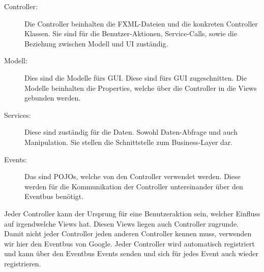 \begin{description}
	\item[Controller:] Die Controller beinhalten die FXML-Dateien und die konkreten Controller Klassen. Sie sind für die Benutzer-Aktionen, Service-Calls, sowie die Beziehung zwischen Modell und UI zuständig.
	\item[Modell:] Dies sind die Modelle fürs GUI. Diese sind fürs GUI zugeschnitten. Die Modelle beinhalten die Properties, welche über die Controller in die Views gebunden werden.
	\item[Services:] Diese sind zuständig für die Daten. Sowohl Daten-Abfrage und auch Manipulation. Sie stellen die Schnittstelle zum Business-Layer dar.
	\item[Events:] Das sind POJOs, welche von den Controller verwendet werden. Diese werden für die Kommunikation der Controller untereinander über den Eventbus benötigt.
\end{description}
Jeder Controller kann der Ursprung für eine Benutzeraktion sein, welcher Einfluss auf irgendwelche Views hat. Diesen Views liegen auch Controller zugrunde. Damit nicht jeder Controller jeden anderen Controller kennen muss, verwenden wir hier den Eventbus von Google. Jeder Controller wird automatisch registriert und kann über den Eventbus Events senden und sich für jedes Event auch wieder registrieren.

